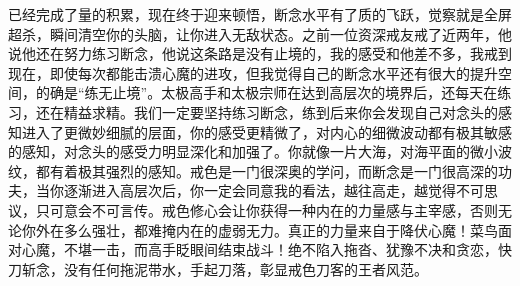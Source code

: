 \begin{case}
已经完成了量的积累，现在终于迎来顿悟，断念水平有了质的飞跃，觉察就是全屏超杀，瞬间清空你的头脑，让你进入无敌状态。之前一位资深戒友戒了近两年，他说他还在努力练习断念，他说这条路是没有止境的，我的感受和他差不多，我戒到现在，即使每次都能击溃心魔的进攻，但我觉得自己的断念水平还有很大的提升空间，的确是“练无止境”。太极高手和太极宗师在达到高层次的境界后，还每天在练习，还在精益求精。我们一定要坚持练习断念，练到后来你会发现自己对念头的感知进入了更微妙细腻的层面，你的感受更精微了，对内心的细微波动都有极其敏感的感知，对念头的感受力明显深化和加强了。你就像一片大海，对海平面的微小波纹，都有着极其强烈的感知。戒色是一门很深奥的学问，而断念是一门很高深的功夫，当你逐渐进入高层次后，你一定会同意我的看法，越往高走，越觉得不可思议，只可意会不可言传。戒色修心会让你获得一种内在的力量感与主宰感，否则无论你外在多么强壮，都难掩内在的虚弱无力。真正的力量来自于降伏心魔！菜鸟面对心魔，不堪一击，而高手眨眼间结束战斗！绝不陷入拖沓、犹豫不决和贪恋，快刀斩念，没有任何拖泥带水，手起刀落，彰显戒色刀客的王者风范。
\end{case}

